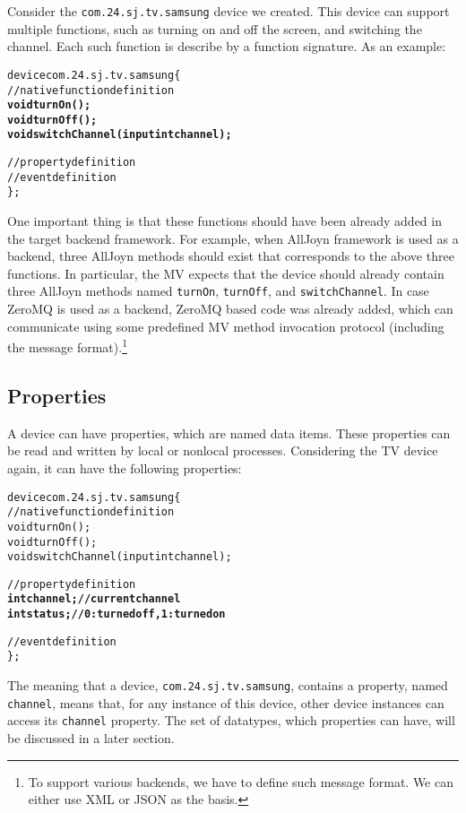 \documentclass{myproc}
\begin{document}
Consider the \verb+com.24.sj.tv.samsung+ device we created.
This device can support
multiple functions, such as turning on and off the screen, and switching the
channel. Each such function is describe by a function signature. 
As an example:
\begin{alltt}
  device com.24.sj.tv.samsung \{
    // native function definition
    \textbf{void turnOn();
    void turnOff(); 
    void switchChannel(input int channel);}

    // property definition
    // event definition
  \};
\end{alltt}
One important thing is that these functions should have been already added 
in  the target backend framework. For example, when AllJoyn
framework is used as a backend, three AllJoyn methods should exist that
corresponds to the above three functions. In particular, the MV expects
that the device should already contain three AllJoyn methods named
\verb+turnOn+, \verb+turnOff+, and  \verb+switchChannel+.  
In case ZeroMQ is
used as a backend, ZeroMQ based  
code was already added, which can communicate using some predefined MV method
invocation protocol (including the message format).\footnote{To support various
  backends, we have to define such message format. We can either use XML or
  JSON as the basis.}





\subsection{Properties}
A device can have properties, which are named data items.
These properties can be read and written by local or nonlocal processes.
Considering the TV device again, it can have the following properties:
\begin{alltt}
  device com.24.sj.tv.samsung \{
    // native function definition
    void turnOn();
    void turnOff(); 
    void switchChannel(input int channel);

    // property definition
    \textbf{int channel;     // current channel
    int status;      // 0: turned off, 1: turned on}

    // event definition
  \};
\end{alltt}
The meaning that a device, \verb+com.24.sj.tv.samsung+, contains a 
property, named \verb+channel+, means that, for any instance of this device,
other device instances can access its \verb+channel+ property.
The set of datatypes, which properties can have, will be discussed in a later
section. 
\end{document}
